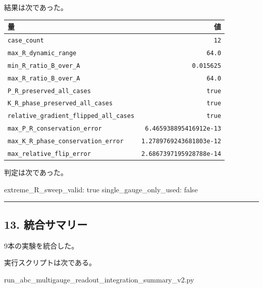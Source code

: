 \documentclass[
  a4paper,
]{article}
\newenvironment{Shaded}{}{}
\newcommand{\NormalTok}[1]{#1}
\newcounter{none} %
\begin{document}
結果は次であった。

{\def\LTcaptype{none} %
\begin{longtable}[]{@{}lr@{}}
\toprule\noalign{}
量 & 値 \\
\midrule\noalign{}
\endhead
\bottomrule\noalign{}
\endlastfoot
\texttt{case\_count} & \texttt{12} \\
\texttt{max\_R\_dynamic\_range} & \texttt{64.0} \\
\texttt{min\_R\_ratio\_B\_over\_A} & \texttt{0.015625} \\
\texttt{max\_R\_ratio\_B\_over\_A} & \texttt{64.0} \\
\texttt{P\_R\_preserved\_all\_cases} & \texttt{true} \\
\texttt{K\_R\_phase\_preserved\_all\_cases} & \texttt{true} \\
\texttt{relative\_gradient\_flipped\_all\_cases} & \texttt{true} \\
\texttt{max\_P\_R\_conservation\_error} &
\texttt{6.465938895416912e-13} \\
\texttt{max\_K\_R\_phase\_conservation\_error} &
\texttt{1.2789769243681803e-12} \\
\texttt{max\_relative\_flip\_error} & \texttt{2.6867397195928788e-14} \\
\end{longtable}
}

判定は次であった。

\begin{Shaded}
\begin{Highlighting}[]
\NormalTok{extreme\_R\_sweep\_valid: true}
\NormalTok{single\_gauge\_only\_used: false}
\end{Highlighting}
\end{Shaded}

\begin{center}\rule{0.5\linewidth}{0.5pt}\end{center}

\subsection{13.
統合サマリー}\label{ux7d71ux5408ux30b5ux30deux30eaux30fc}

9本の実験を統合した。

実行スクリプトは次である。

\begin{Shaded}
\begin{Highlighting}[]
\NormalTok{run\_abc\_multigauge\_readout\_integration\_summary\_v2.py}
\end{Highlighting}
\end{Shaded}
\end{document}
